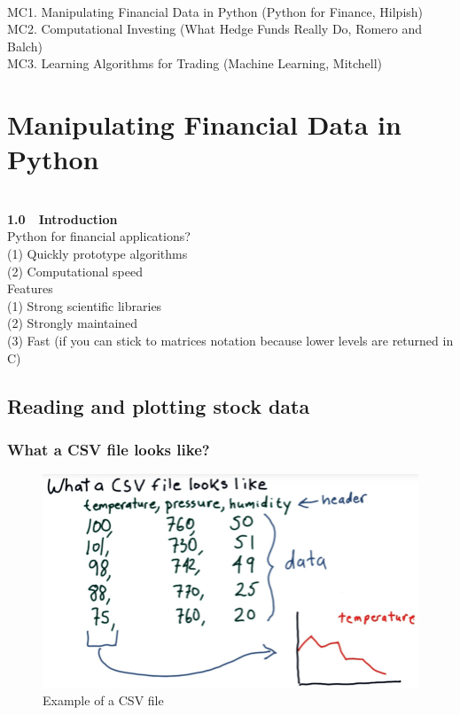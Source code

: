 \documentclass[12pt]{article}
\date{}
\begin{document}
\begin{center}
     \\[5pt]
\end{center}

\noindent
MC1. Manipulating Financial Data in Python (Python for Finance, Hilpish)\\
\noindent
MC2. Computational Investing (What Hedge Funds Really Do, Romero and Balch) \\
\noindent
MC3. Learning Algorithms for Trading (Machine Learning, Mitchell) 

\section{Manipulating Financial Data in Python}
\textcolor{white}{.} \\[-15pt]
\noindent
{\large\bf 1.0 \textcolor{white}{.} Introduction} \\ [5pt]
Python for financial applications? \\
(1) Quickly prototype algorithms \\
(2) Computational speed \\ [5pt]
\noindent
Features \\
(1) Strong scientific libraries \\
(2) Strongly maintained \\
(3) Fast (if you can stick to matrices notation because lower levels are returned in C)

\subsection{Reading and plotting stock data}

\subsubsection{What a CSV file looks like?} 
\begin{figure}[!ht]
\centering
\includegraphics[scale=0.3]{fig/fig1}
\caption{Example of a CSV file}
\end{figure}
\end{document}

